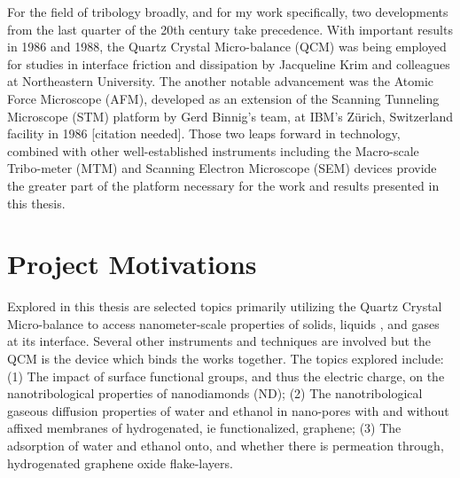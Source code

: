 For the field of tribology broadly, and for my work specifically, two developments from the last quarter of the 20th century take precedence.  With important results in 1986\cite{102} and 1988\cite{204}, the Quartz Crystal Micro-balance (QCM) was being employed for studies in interface friction and dissipation by Jacqueline Krim and colleagues at Northeastern University. The another notable advancement was the Atomic Force Microscope (AFM), developed as an extension of the Scanning Tunneling Microscope (STM) platform by Gerd Binnig's team, at IBM's Zürich, Switzerland facility in 1986 [citation needed]. Those two leaps forward in technology, combined with other well-established instruments including the Macro-scale Tribo-meter (MTM) and Scanning Electron Microscope (SEM) devices provide the greater part of the platform necessary for the work and results presented in this thesis. 

%
%
%
%


\section{Project Motivations}

Explored in this thesis are selected topics primarily utilizing the Quartz Crystal Micro-balance to access nanometer-scale properties of solids, liquids \cite{106}, and gases at its interface. Several other instruments and techniques are involved but the QCM is the device which binds the works together. The topics explored include: (1) The impact of surface functional groups, and thus the electric charge, on the nanotribological properties of nanodiamonds (ND); (2) The nanotribological gaseous diffusion properties of water and ethanol in nano-pores with and without affixed membranes of hydrogenated, ie functionalized, graphene; (3) The adsorption of water and ethanol onto, and whether there is permeation through, hydrogenated graphene oxide flake-layers.

